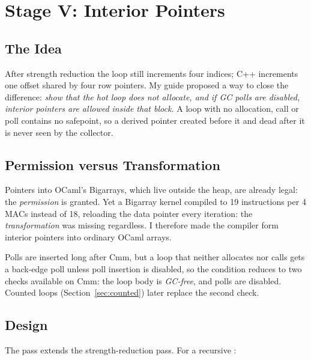 \section{Stage V: Interior Pointers}
\label{sec:ip}

\subsection{The Idea}
After strength reduction the loop still increments four indices; C++
increments one offset shared by four row pointers. My guide proposed a way to
close the difference: \emph{show that the hot loop does not
allocate, and if GC polls are disabled, interior pointers are allowed inside
that block.} A loop with no allocation, call or poll contains no safepoint, so
a derived pointer created before it and dead after it is never seen by the
collector.

\subsection{Permission versus Transformation}
Pointers into OCaml's Bigarrays, which live outside the heap, are already
legal: the \emph{permission} is granted. Yet a Bigarray kernel compiled to 19
instructions per 4 MACs instead of 18, reloading the data pointer every
iteration: the \emph{transformation} was missing regardless. I therefore made
the compiler form interior pointers into ordinary OCaml arrays.

Polls are inserted long after Cmm, but a loop that neither allocates nor calls
gets a back-edge poll unless poll insertion is disabled, so the condition
reduces to two checks available on Cmm: the loop body is \emph{GC-free}, and
polls are disabled. Counted loops (Section~\ref{sec:counted}) later replace
the second check.

\subsection{Design}
\label{sec:ip-design}
The pass extends the strength-reduction pass. For a recursive :

